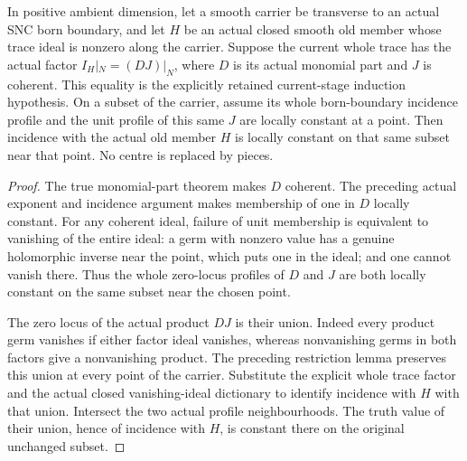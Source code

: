 \begin{theorem}
\label{hir:sharp-actual-factor-forces-trace-incidence}
\leanok
In positive ambient dimension, let a smooth carrier be transverse to an actual SNC born boundary, and let
$H$ be an actual closed smooth old member whose trace ideal is nonzero
along the carrier. Suppose the current whole trace has the actual factor
$I_H|_N=(D J)|_N$, where $D$ is its actual monomial part and $J$ is coherent.
This equality is the explicitly retained current-stage induction hypothesis.
On a subset of the carrier, assume its whole born-boundary incidence
profile and the unit profile of this same $J$ are locally constant at a
point. Then incidence with the actual old member $H$ is locally constant
on that same subset near that point. No centre is replaced by pieces.
\end{theorem}
\begin{proof}
The true monomial-part theorem makes $D$ coherent. The preceding actual
exponent and incidence argument makes membership of one in $D$ locally
constant. For any coherent ideal, failure of unit membership is equivalent
to vanishing of the entire ideal: a germ with nonzero value has a genuine
holomorphic inverse near the point, which puts one in the ideal; and one
cannot vanish there. Thus the whole zero-locus profiles of $D$ and $J$ are
both locally constant on the same subset near the chosen point.

The zero locus of the actual product $D J$ is their union. Indeed every
product germ vanishes if either factor ideal vanishes, whereas nonvanishing
germs in both factors give a nonvanishing product. The preceding restriction
lemma preserves this union at every point of the carrier. Substitute the
explicit whole trace factor and the actual closed vanishing-ideal dictionary
to identify incidence with $H$ with that union. Intersect the two actual
profile neighbourhoods. The truth value of their union, hence of incidence
with $H$, is constant there on the original unchanged subset.
\end{proof}
